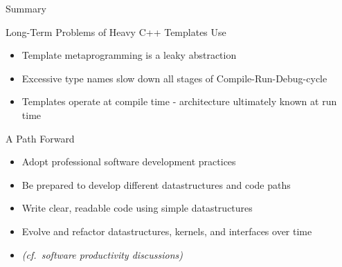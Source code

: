 \begin{frame}{Summary}

 \begin{block}{Long-Term Problems of Heavy C++ Templates Use}
  \begin{itemize}
   \item Template metaprogramming is a leaky abstraction
   \item Excessive type names slow down all stages of Compile-Run-Debug-cycle
   \item Templates operate at compile time - architecture ultimately known at run time
  \end{itemize}
 \end{block}
 
 \begin{block}{A Path Forward}
  \begin{itemize}
   \item Adopt professional software development practices
   \item Be prepared to develop different datastructures and code paths
   \item Write clear, readable code using simple datastructures
   \item Evolve and refactor datastructures, kernels, and interfaces over time
   \item \emph{(cf.~software productivity discussions)}
  \end{itemize}
 \end{block}
 

\end{frame}
